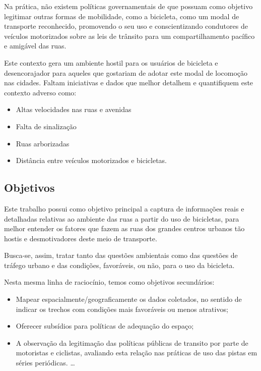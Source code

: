 \documentclass[final,12pt, times, 5p, twocolumn]{elsarticle}
\begin{document}
Na prática, não existem políticas governamentais de que possuam como objetivo legitimar outras formas de mobilidade, como a bicicleta, como um modal de transporte reconhecido, promovendo o seu uso e conscientizando condutores de veículos motorizados sobre as leis de trânsito para um compartilhamento pacífico e amigável das ruas. 

Este contexto gera um ambiente hostil para os usuários de bicicleta e desencorajador para aqueles que gostariam de adotar este modal de locomoção nas cidades. Faltam iniciativas e dados que melhor detalhem e quantifiquem este contexto adverso como:
\begin{itemize}

  \item Altas velocidades nas ruas e avenidas
  \item Falta de sinalização
  \item Ruas arborizadas
  \item Distância entre veículos motorizados e bicicletas.

\end{itemize}

\subsection{Objetivos}

Este trabalho possui como objetivo principal a captura de informações reais e detalhadas relativas ao ambiente das ruas a partir do uso de bicicletas, para melhor entender os fatores que fazem as ruas dos grandes centros urbanos tão hostis e desmotivadores deste meio de transporte. 

Busca-se, assim, tratar tanto das questões ambientais como das questões de tráfego urbano e das condições, favoráveis, ou não, para o uso da bicicleta.

Nesta mesma linha de raciocínio, temos como objetivos secundários:

\begin{itemize}

  \item Mapear espacialmente/geograficamente os dados coletados, no sentido de indicar os trechos com condições mais favoráveis ou menos atrativos;
  \item Oferecer subsídios para políticas de adequação do espaço;
  \item A observação da legitimação das políticas públicas de transito por parte de motoristas e ciclistas, avaliando esta relação nas práticas de uso das pistas em séries periódicas. \ldots

\end{itemize}
\end{document}
